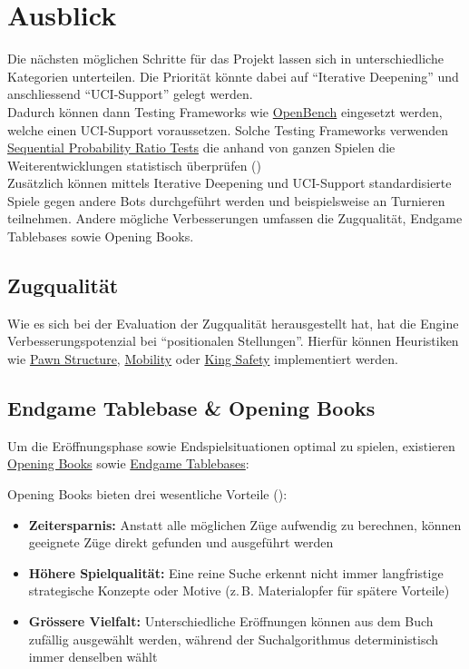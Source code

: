 \chapter{Ausblick}

Die nächsten möglichen Schritte für das Projekt lassen sich in unterschiedliche Kategorien unterteilen. Die Priorität
könnte dabei auf \enquote{Iterative Deepening} und anschliessend \enquote{UCI-Support} gelegt werden. \\
Dadurch können dann Testing Frameworks wie \href{https://github.com/AndyGrant/OpenBench}{OpenBench} eingesetzt werden,
welche einen UCI-Support voraussetzen. Solche Testing Frameworks verwenden
\href{https://www.chessprogramming.org/Sequential_Probability_Ratio_Test}{Sequential Probability Ratio Tests}
die anhand von ganzen Spielen die Weiterentwicklungen statistisch überprüfen (\cite{sequentialProbabilityRatioTest}) \\
Zusätzlich können mittels Iterative Deepening und UCI-Support standardisierte Spiele gegen andere Bots durchgeführt werden
und beispielsweise an Turnieren teilnehmen.
Andere mögliche Verbesserungen umfassen die Zugqualität, Endgame Tablebases sowie Opening Books.

\section{Zugqualität}

Wie es sich bei der Evaluation der Zugqualität herausgestellt hat, hat die Engine Verbesserungspotenzial bei \enquote{positionalen Stellungen}.
Hierfür können Heuristiken wie \href{https://www.chessprogramming.org/Pawn_Structure}{Pawn Structure},
\href{https://www.chessprogramming.org/Mobility}{Mobility} oder \href{https://www.chessprogramming.org/King_Safety}{King Safety}
implementiert werden.

\section{Endgame Tablebase \& Opening Books}

Um die Eröffnungsphase sowie Endspielsituationen optimal zu spielen, existieren
\href{https://www.chessprogramming.org/Opening_Book}{Opening Books} sowie
\href{https://www.chessprogramming.org/Endgame_Tablebases}{Endgame Tablebases}:

Opening Books bieten drei wesentliche Vorteile (\cite{openingBook}):

\begin{itemize}
    \item \textbf{Zeitersparnis:} Anstatt alle möglichen Züge aufwendig zu berechnen, können geeignete Züge direkt gefunden und ausgeführt werden
    \item \textbf{Höhere Spielqualität:} Eine reine Suche erkennt nicht immer langfristige strategische Konzepte oder Motive (z.\,B. Materialopfer für spätere Vorteile)
    \item \textbf{Grössere Vielfalt:} Unterschiedliche Eröffnungen können aus dem Buch zufällig ausgewählt werden, während der Suchalgorithmus deterministisch immer denselben wählt
\end{itemize}


